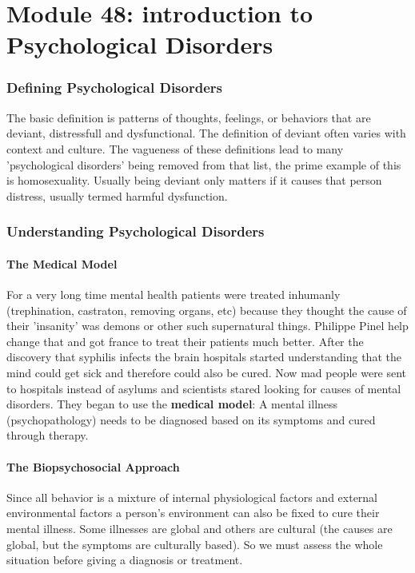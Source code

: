\documentclass[12pt]{article}
\begin{document}
\part*{Module 48: introduction to Psychological Disorders}
\section*{Defining Psychological Disorders}
The basic definition is patterns of thoughts, feelings, or behaviors that are deviant, distressfull and dysfunctional. The definition of deviant often varies with context and culture. The vagueness of these definitions lead to many 'psychological disorders' being removed from that list, the prime example of this is homosexuality. Usually being deviant only matters if it causes that person distress, usually termed harmful dysfunction. 
\section*{Understanding Psychological Disorders}
\subsection*{The Medical Model}
For a very long time mental health patients were treated inhumanly (trephination, castraton, removing organs, etc) because they thought the cause of their 'insanity' was demons or other such supernatural things. Philippe Pinel help change that and got france to treat their patients much better. After the discovery that syphilis infects the brain hospitals started understanding that the mind could get sick and therefore could also be cured. Now mad people were sent to hospitals instead of asylums and scientists stared looking for causes of mental disorders. They began to use the \textbf{medical model}: A mental illness (psychopathology) needs to be diagnosed based on its symptoms and cured through therapy.
\subsection*{The Biopsychosocial Approach}
Since all behavior is a mixture of internal physiological factors and external environmental factors a person's environment can also be fixed to cure their mental illness. Some illnesses are global and others are cultural (the causes are global, but the symptoms are culturally based). So we must assess the whole situation before giving a diagnosis or treatment.
\end{document}
